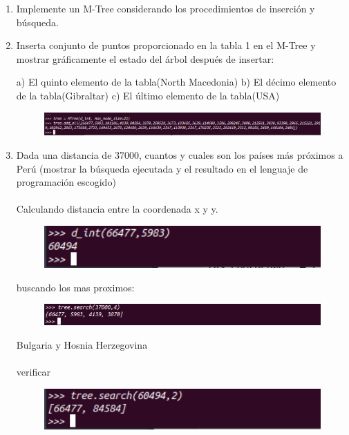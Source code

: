 \documentclass[a4paper]{article}
\begin{document}
\begin{enumerate}
\item  Implemente un M-Tree considerando los procedimientos de inserción y búsqueda.


\item  Inserta conjunto de puntos proporcionado en la tabla 1 en el M-Tree y mostrar gráficamente el estado del árbol después de
insertar:

a) El quinto elemento de la tabla(North Macedonia)
b) El décimo elemento de la tabla(Gibraltar)
c) El último elemento de la tabla(USA)

\begin{figure}[H]
  \centering
  \includegraphics[width=1\textwidth]{imagenes/Captura de pantalla de 2021-12-16 10-04-01.png}
\end{figure}

\item Dada una distancia de 37000, cuantos y cuales son los países más próximos a Perú (mostrar la búsqueda ejecutada y el
resultado en el lenguaje de programación escogido)
\\\\
Calculando distancia entre la coordenada x y y.
\begin{figure}[H]
  \centering
  \includegraphics[width=1\textwidth]{imagenes/Captura de pantalla de 2021-12-16 10-13-51.png}
\end{figure}
buscando los mas proximos:
\begin{figure}[H]
  \centering
  \includegraphics[width=1\textwidth]{imagenes/Captura de pantalla de 2021-12-16 10-17-42.png}
\end{figure}

Bulgaria y Hosnia Herzegovina
\\\\
verificar
\begin{figure}[H]
  \centering
  \includegraphics[width=1\textwidth]{imagenes/Captura de pantalla de 2021-12-16 10-26-06.png}
\end{figure}


\end{enumerate}
\end{document}
